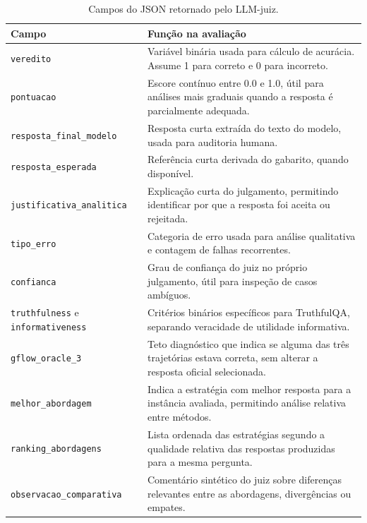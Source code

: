 \documentclass[12pt]{article}
\begin{document}
\begin{table}[H]
\centering
\footnotesize
\setlength{\tabcolsep}{3pt}
\renewcommand{\arraystretch}{1.18}
\caption{Campos do JSON retornado pelo LLM-juiz.}
\label{tab:json_juiz}
\begin{tabular}{|>{\raggedright\arraybackslash}p{4.7cm}|>{\raggedright\arraybackslash}p{8.1cm}|}
\hline
\textbf{Campo} & \textbf{Função na avaliação} \\
\hline
\texttt{veredito} & Variável binária usada para cálculo de acurácia. Assume 1 para correto e 0 para incorreto. \\
\hline
\texttt{pontuacao} & Escore contínuo entre 0.0 e 1.0, útil para análises mais graduais quando a resposta é parcialmente adequada. \\
\hline
\texttt{resposta\_final\_modelo} & Resposta curta extraída do texto do modelo, usada para auditoria humana. \\
\hline
\texttt{resposta\_esperada} & Referência curta derivada do gabarito, quando disponível. \\
\hline
\texttt{justificativa\_analitica} & Explicação curta do julgamento, permitindo identificar por que a resposta foi aceita ou rejeitada. \\
\hline
\texttt{tipo\_erro} & Categoria de erro usada para análise qualitativa e contagem de falhas recorrentes. \\
\hline
\texttt{confianca} & Grau de confiança do juiz no próprio julgamento, útil para inspeção de casos ambíguos. \\
\hline
\texttt{truthfulness} e \texttt{informativeness} & Critérios binários específicos para TruthfulQA, separando veracidade de utilidade informativa. \\
\hline
\texttt{gflow\_oracle\_3} & Teto diagnóstico que indica se alguma das três trajetórias estava correta, sem alterar a resposta oficial selecionada. \\
\hline
\texttt{melhor\_abordagem} & Indica a estratégia com melhor resposta para a instância avaliada, permitindo análise relativa entre métodos. \\
\hline
\texttt{ranking\_abordagens} & Lista ordenada das estratégias segundo a qualidade relativa das respostas produzidas para a mesma pergunta. \\
\hline
\texttt{observacao\_comparativa} & Comentário sintético do juiz sobre diferenças relevantes entre as abordagens, divergências ou empates. \\
\hline
\end{tabular}
\end{table}
\end{document}
